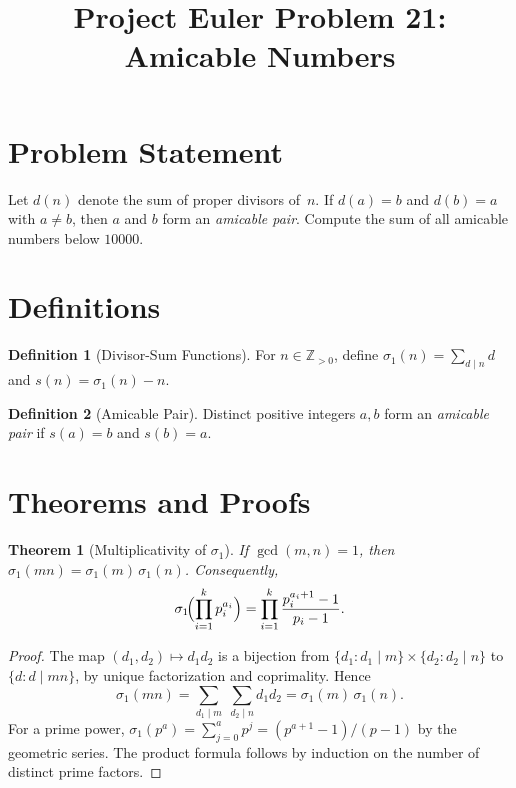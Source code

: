 \documentclass[12pt,a4paper]{article}
\title{Project Euler Problem 21: Amicable Numbers}
\author{}
\date{}
\newtheorem{theorem}{Theorem}
\theoremstyle{definition}
\newtheorem{definition}{Definition}
\begin{document}
\maketitle

\section{Problem Statement}

Let $d(n)$ denote the sum of proper divisors of~$n$. If $d(a) = b$ and $d(b) = a$ with $a \neq b$, then $a$ and $b$ form an \emph{amicable pair}. Compute the sum of all amicable numbers below $10000$.

\section{Definitions}

\begin{definition}[Divisor-Sum Functions]
For $n \in \mathbb{Z}_{>0}$, define $\sigma_1(n) = \sum_{d \mid n} d$ and $s(n) = \sigma_1(n) - n$.
\end{definition}

\begin{definition}[Amicable Pair]
Distinct positive integers $a, b$ form an \emph{amicable pair} if $s(a) = b$ and $s(b) = a$.
\end{definition}

\section{Theorems and Proofs}

\begin{theorem}[Multiplicativity of $\sigma_1$]
If $\gcd(m, n) = 1$, then $\sigma_1(mn) = \sigma_1(m)\,\sigma_1(n)$. Consequently,
\[
\sigma_1\!\Bigl(\prod_{i=1}^{k} p_i^{a_i}\Bigr) = \prod_{i=1}^{k} \frac{p_i^{a_i+1} - 1}{p_i - 1}.
\]
\end{theorem}

\begin{proof}
The map $(d_1, d_2) \mapsto d_1 d_2$ is a bijection from $\{d_1 : d_1 \mid m\} \times \{d_2 : d_2 \mid n\}$ to $\{d : d \mid mn\}$, by unique factorization and coprimality. Hence
\[
\sigma_1(mn) = \sum_{d_1 \mid m}\;\sum_{d_2 \mid n} d_1 d_2 = \sigma_1(m)\,\sigma_1(n).
\]
For a prime power, $\sigma_1(p^a) = \sum_{j=0}^{a} p^j = (p^{a+1}-1)/(p-1)$ by the geometric series. The product formula follows by induction on the number of distinct prime factors.
\end{proof}
\end{document}
